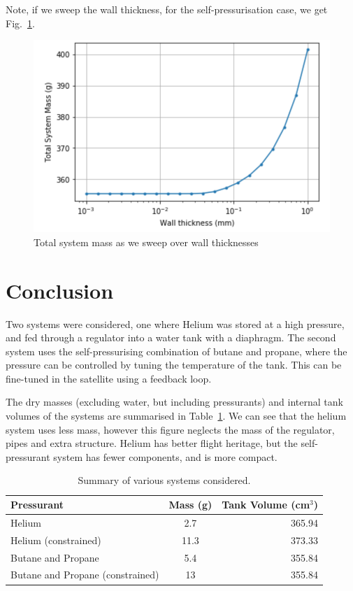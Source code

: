 \documentclass[12pt]{article}
\begin{document}
Note, if we sweep the wall thickness, for the self-pressurisation case, we get Fig.~\ref{fig:sweep}.
\begin{figure}[htbp]
   \centering
   \includegraphics[width=0.5\linewidth]{sweep}
   \caption{Total system mass as we sweep over wall thicknesses}
   \label{fig:sweep}
\end{figure}





\section{Conclusion}

Two systems were considered, one where Helium was stored at a high pressure, and fed through a regulator into a water tank with a diaphragm. The second system uses the self-pressurising combination of butane and propane, where the pressure can be controlled by tuning the temperature of the tank. This can be fine-tuned in the satellite using a feedback loop. 

The dry masses (excluding water, but including pressurants)  and internal tank volumes of the systems are summarised in Table~\ref{tbl:Summary}. We can see that the helium system uses less mass, however this figure neglects the mass of the regulator, pipes and extra structure. Helium has better flight heritage, but the self-pressurant system has fewer components, and is more compact.

\begin{table}[htbp]
   \centering
   \caption{Summary of various systems considered.}
   \begin{tabular}{@{} lcr @{}}
      \toprule
       Pressurant & Mass (g) & Tank Volume (cm$^3$)\\
      \midrule
Helium & 2.7 & 365.94 \\
Helium (constrained) & 11.3 & 373.33\\
\midrule
Butane and Propane & 5.4 & 355.84\\
Butane and Propane (constrained) & 13 & 355.84\\
      \bottomrule
   \end{tabular}
   \label{tbl:Summary}
\end{table}







\end{document}
